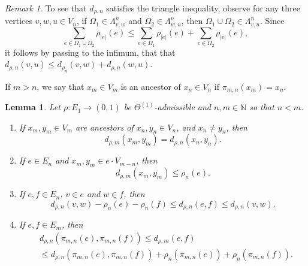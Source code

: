 \documentclass{amsart}
\newtheorem{lemma}[equation]{Lemma}
\numberwithin{equation}{section}
\theoremstyle{definition}
\theoremstyle{remark}
\newtheorem{remark}[equation]{Remark}
\newcommand{\N}{\mathbb{N}}
\begin{document}
\begin{remark}
    To see that \(d_{\rho,n}\) satisfies the triangle inequality, observe for any three vertices \(v,w,u\in V_n\), if \(\Omega_1\in\Lambda_{v,w}^n\) and \(\Omega_2\in \Lambda_{w,u}^n\), then \(\Omega_1\cup\Omega_2\in\Lambda_{v,u}^n\). Since \[\sum_{e\in\Omega_1\cup\Omega_2}\rho_{\lvert e \rvert}(e)\leq\sum_{e\in\Omega_1}\rho_{\lvert e \rvert}(e)+\sum_{e\in\Omega_2}\rho_{\lvert e \rvert}(e),\]
    it follows by passing to the infimum, that that \(d_{\rho,n}(v,u)\leq d_{\rho_n}(v,w)+d_{\rho,n}(w,u).\)
\end{remark}

If $m>n$, we say that $x_m\in V_m$ is an ancestor of $x_n \in V_n$ if $\pi_{m,n}(x_m)=x_n$.
        


\begin{lemma}\label{Lemma: Distance Lemma 1}
    Let \(\rho\colon E_1\to (0,1)\) be \(\Theta^{(1)}\)-admissible and \(n,m\in \N\) so that \(n<m\).
    \begin{enumerate}[label={\color{blue}{\textup{$($DL\arabic*}$)$}}, widest=a, leftmargin=*]
        \item \label{Lemma: DL(1)} If \(x_m,y_m\in V_m\) are ancestors of \(x_n,y_n\in V_n\), and \(x_n\neq y_n\), then 
            \[
                d_{\rho,m}(x_m,y_m)=d_{\rho,n}(x_n,y_n).
            \]
        \item \label{Lemma: DL(2)} If \(e\in E_n\) and \(x_m,y_m\in e\cdot V_{m-n}\), then
            \[
                d_{\rho,m}(x_m,y_m)\leq \rho_n(e).
            \]
        \item \label{Lemma: DL(3)} If \(e,f\in E_n\), \(v\in e\) and \(w\in f\), then
            \[
                d_{\rho,n}(v,w)-\rho_n(e)-\rho_n(f)\leq d_{\rho,n}(e,f)\leq d_{\rho,n}(v,w).
            \]
        \item \label{Lemma: DL(4)} If \(e,f\in E_m\), then
            \[
            \begin{split}
                &d_{\rho,n}(\pi_{m,n}(e),\pi_{m,n}(f))\leq d_{\rho,m}(e,f)\\
                &\leq d_{\rho,n}(\pi_{m,n}(e),\pi_{m,n}(f))+\rho_n(\pi_{m,n}(e))+\rho_n(\pi_{m,n}(f)).
            \end{split}
            \]
    \end{enumerate}
\end{lemma}
\end{document}
